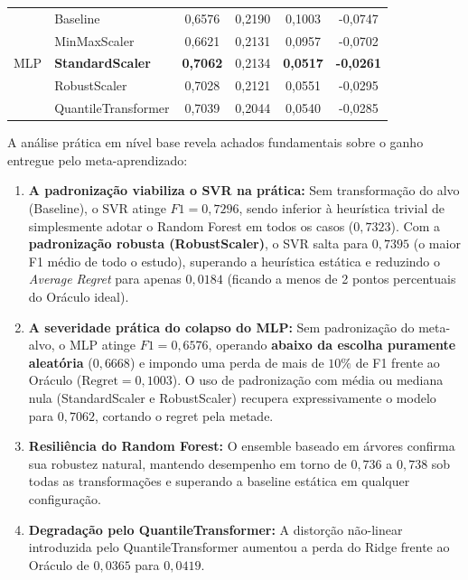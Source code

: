 \documentclass[12pt]{article}
\begin{document}
\begin{table}[ht]
{\begin{tabular}{llcccc}
\midrule
\multirow{5}{*}{MLP} 
 & Baseline                    & 0,6576 & 0,2190 & 0,1003 & -0,0747 \\
 & MinMaxScaler                & 0,6621 & 0,2131 & 0,0957 & -0,0702 \\
 & \textbf{StandardScaler}     & \textbf{0,7062} & 0,2134 & \textbf{0,0517} & \textbf{-0,0261} \\
 & RobustScaler                & 0,7028 & 0,2121 & 0,0551 & -0,0295 \\
 & QuantileTransformer         & 0,7039 & 0,2044 & 0,0540 & -0,0285 \\
\bottomrule
\end{tabular}%
}
\end{table}

A análise prática em nível base revela achados fundamentais sobre o ganho entregue pelo meta-aprendizado:

\begin{enumerate}
  \item \textbf{A padronização viabiliza o SVR na prática:} Sem transformação do alvo (Baseline), o SVR atinge $F1 = 0{,}7296$, sendo inferior à heurística trivial de simplesmente adotar o Random Forest em todos os casos ($0{,}7323$). Com a \textbf{padronização robusta (RobustScaler)}, o SVR salta para \textbf{$0{,}7395$} (o maior F1 médio de todo o estudo), superando a heurística estática e reduzindo o \textit{Average Regret} para apenas $0{,}0184$ (ficando a menos de 2 pontos percentuais do Oráculo ideal).
  \item \textbf{A severidade prática do colapso do MLP:} Sem padronização do meta-alvo, o MLP atinge $F1 = 0{,}6576$, operando \textbf{abaixo da escolha puramente aleatória} ($0{,}6668$) e impondo uma perda de mais de $10\%$ de F1 frente ao Oráculo ($\text{Regret} = 0{,}1003$). O uso de padronização com média ou mediana nula (StandardScaler e RobustScaler) recupera expressivamente o modelo para $0{,}7062$, cortando o regret pela metade.
  \item \textbf{Resiliência do Random Forest:} O ensemble baseado em árvores confirma sua robustez natural, mantendo desempenho em torno de $0{,}736$ a $0{,}738$ sob todas as transformações e superando a baseline estática em qualquer configuração.
  \item \textbf{Degradação pelo QuantileTransformer:} A distorção não-linear introduzida pelo QuantileTransformer aumentou a perda do Ridge frente ao Oráculo de $0{,}0365$ para $0{,}0419$.
\end{enumerate}
\end{document}
